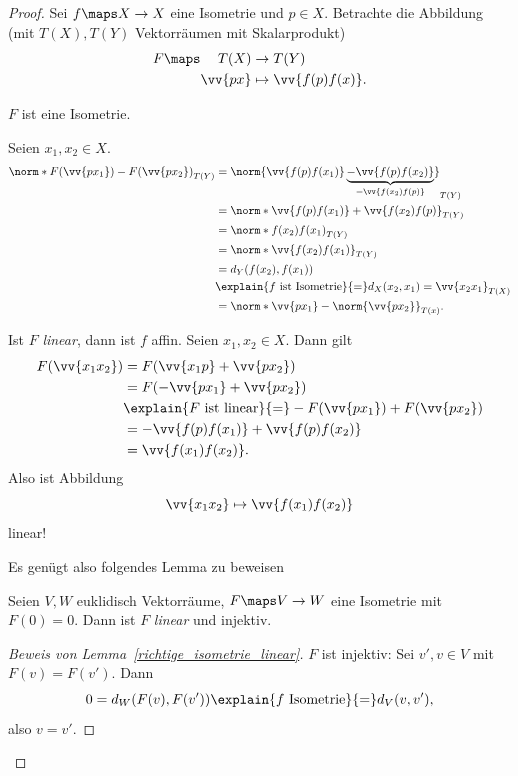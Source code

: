 \begin{proof}
  Sei \( f\maps X\to X \) eine Isometrie und \( p\in X \). Betrachte die Abbildung (mit \( T(X),T(Y) \) Vektorräumen mit Skalarprodukt)
  \begin{equation*}
    F\maps \begin{aligned}[t]
      T(X)&\to T(Y)\\
      \vv{px} &\mapsto \vv{f(p)f(x)}.
    \end{aligned}
  \end{equation*}
  \begin{beweisbehauptung}
    \( F \) ist eine Isometrie.
  \end{beweisbehauptung}
  Seien \( x_1,x_2\in X \).
  \begin{align*}
    \norm*{F(\vv{px_1})-F(\vv{px_2})}_{T(Y)}&=\norm{\vv{f(p)f(x_1)}\underbrace{-\vv{f(p)f(x_2)}}_{=\vv{f(x_2)f(p)}}}_{T(Y)}\\
    &=\norm*{\vv{f(p) f(x_1)}+\vv{f(x_2) f(p)}}_{T(Y)}\\
    &=\norm*{f(x_2)f(x_1)}_{T(Y)}\\
    &=\norm*{\vv{f(x_2) f(x_1)}}_{T(Y)}\\
    &=d_Y(f(x_2), f(x_1))\\
    &\explain{\text{\( f \) ist Isometrie}}{=} d_X(x_2,x_1)=\vv{x_2 x_1}_{T(X)}\\
    &=\norm*{\vv{px_1}-\norm{\vv{px_2}}}_{T(x)}.
  \end{align*}
  \begin{beweisbehauptung}
    Ist \( F \) \emph{linear}, dann ist \( f \) affin. Seien \( x_1,x_2\in X \). Dann gilt 
    \begin{align*}
      F(\vv{x_1 x_2})&=F(\vv{x_1 p}+\vv{p x_2})\\
      &=F(-\vv{px_1}+\vv{px_2})\\
      &\explain{\text{\( F \) ist linear}}{=}-F(\vv{px_1})+F(\vv{px_2})\\
      &=-\vv{f(p)f(x_1)}+\vv{f(p) f(x_2)}\\
      &=\vv{f(x_1)f(x_2)}.
    \end{align*}
    Also ist Abbildung
    \begin{equation*}
      \vv{x_1 x_2}\mapsto \vv{f(x_1) f(x_2)}
    \end{equation*}
    linear!
  \end{beweisbehauptung}
  Es genügt also folgendes Lemma zu beweisen
  \begin{lemma}\label{richtige_isometrie_linear}
    Seien \( V,W \) euklidisch Vektorräume, \( F\maps V\to W \) eine Isometrie mit \( F(0)=0 \). Dann ist \( F \) \emph{linear} und injektiv.
  \end{lemma}
  \begin{proof}[Beweis von Lemma~\ref{richtige_isometrie_linear}]
    \( F \) ist injektiv: Sei \( v',v\in V \) mit \( F(v)=F(v') \). Dann
    \begin{equation*}
      0=d_W(F(v),F(v'))\explain{\text{\( f \) Isometrie}}{=}d_V (v,v'),
    \end{equation*}
    also \( v=v' \).


\end{proof}
\end{proof}
